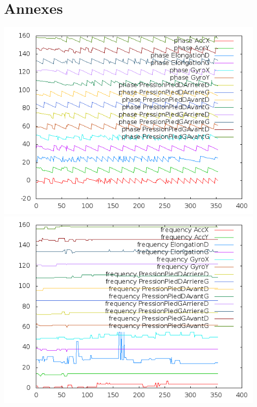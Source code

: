 \documentclass[11pt]{article}
\begin{document}
\section{Annexes}
\includegraphics[scale=0.4]{all_sensor_phases.png}
\includegraphics[scale=0.4]{all_sensor_freq.png}
\end{document}
